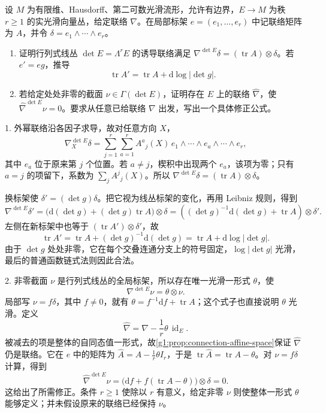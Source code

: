 \begin{exercise}\label{g1:ex:determinant-line-connection}
	设 \(M\) 为有限维、Hausdorff、第二可数光滑流形，允许有边界，\(E\to M\) 为秩 \(r\geq1\) 的实光滑向量丛，给定联络 \(\nabla\)。在局部标架 \(e=(e_1,\ldots,e_r)\) 中记联络矩阵为 \(A\)，并令 \(\delta=e_1\wedge\cdots\wedge e_r\)。
	\begin{enumerate}
		\item 证明行列式线丛 \(\det E=\Lambda^rE\) 的诱导联络满足 \(\nabla^{\det E}\delta=(\operatorname{tr}A)\otimes\delta\)。若 \(e'=eg\)，推导
		\[
			\operatorname{tr}A'=\operatorname{tr}A+\mathrm{d}\log|\det g|.
		\]
		\item 若给定处处非零的截面 \(\nu\in\Gamma(\det E)\)，证明存在 \(E\) 上的联络 \(\widehat\nabla\)，使 \(\widehat\nabla^{\det E}\nu=0\)。要求从任意已给联络 \(\nabla\) 出发，写出一个具体修正公式。
	\end{enumerate}
\end{exercise}
\begin{solution}
	1. 外幂联络沿各因子求导，故对任意方向 \(X\)，
	\[
		\nabla_X^{\det E}\delta
		=\sum_{j=1}^r\sum_{a=1}^r A^a{}_j(X)\,
		e_1\wedge\cdots\wedge e_a\wedge\cdots\wedge e_r,
	\]
	其中 \(e_a\) 位于原来第 \(j\) 个位置。若 \(a\ne j\)，楔积中出现两个 \(e_a\)，该项为零；只有 \(a=j\) 的项留下，系数为 \(\sum_jA^j{}_j(X)\)。所以 \(\nabla^{\det E}\delta=(\operatorname{tr}A)\otimes\delta\)。

	换标架使 \(\delta'=(\det g)\delta\)。把它视为线丛标架的变化，再用 Leibniz 规则，得到
	\[
		\nabla^{\det E}\delta'
		=\bigl(\mathrm{d}(\det g)+(\det g)\operatorname{tr}A\bigr)\otimes\delta
		=\left((\det g)^{-1}\mathrm{d}(\det g)+\operatorname{tr}A\right)\otimes\delta'.
	\]
	左侧在新标架中也等于 \((\operatorname{tr}A')\otimes\delta'\)，故
	\[
		\operatorname{tr}A'=\operatorname{tr}A+(\det g)^{-1}\mathrm{d}(\det g)
		=\operatorname{tr}A+\mathrm{d}\log|\det g|.
	\]
	由于 \(\det g\) 处处非零，它在每个交叠连通分支上的符号固定，\(\log|\det g|\) 光滑，最后的普通函数链式法则因此合法。

	2. 非零截面 \(\nu\) 是行列式线丛的全局标架，所以存在唯一光滑一形式 \(\theta\)，使
	\[
		\nabla^{\det E}\nu=\theta\otimes\nu.
	\]
	局部写 \(\nu=f\delta\)，其中 \(f\ne0\)，就有 \(\theta=f^{-1}\mathrm{d}f+\operatorname{tr}A\)；这个式子也直接说明 \(\theta\) 光滑。定义
	\[
		\widehat\nabla=\nabla-\frac1r\theta\,\operatorname{id}_E.
	\]
	被减去的项是整体的自同态值一形式，故\cref{g1:prop:connection-affine-space}保证 \(\widehat\nabla\) 仍是联络。它在 \(e\) 中的矩阵为 \(\widehat A=A-\tfrac1r\theta I_r\)，于是 \(\operatorname{tr}\widehat A=\operatorname{tr}A-\theta\)。对 \(\nu=f\delta\) 计算，得到
	\[
		\widehat\nabla^{\det E}\nu
		=\bigl(\mathrm{d}f+f(\operatorname{tr}A-\theta)\bigr)\otimes\delta=0.
	\]
	这给出了所需修正。条件 \(r\geq1\) 使除以 \(r\) 有意义，给定非零 \(\nu\) 则使整体一形式 \(\theta\) 能够定义；并未假设原来的联络已经保持 \(\nu\)。
\end{solution}

